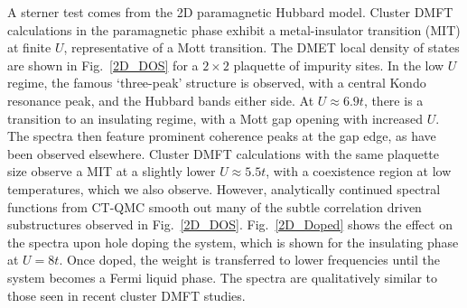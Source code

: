 \documentclass[aps,twocolumn,nobibnotes]{revtex4}
\begin{document}
A sterner test comes from the 2D paramagnetic Hubbard model. Cluster DMFT calculations in the paramagnetic phase exhibit a metal-insulator transition (MIT)
at finite $U$, representative of a Mott transition\cite{Georges1996,Senechal2000,Kotliar2008,Millis2012,Millis2013,Zgid2012}.
The DMET local density of
states are shown in Fig.~\ref{2D_DOS} for a $2 \times 2$ plaquette of impurity sites. In the low $U$ regime, the famous `three-peak' structure 
is observed, with a central Kondo resonance peak, and the Hubbard bands either side. At $U \approx 6.9t$, there is a transition to an insulating 
regime, with a Mott gap opening with increased $U$. The spectra then feature prominent coherence peaks at the gap edge, as have been observed 
elsewhere\cite{Kotliar2008}. Cluster DMFT calculations with the same plaquette size observe a MIT at a slightly lower $U\approx5.5t$, 
with a coexistence region at low temperatures, which we also observe. However, analytically continued
spectral functions from CT-QMC smooth out many of the subtle correlation driven substructures observed in Fig.~\ref{2D_DOS}. 
Fig.~\ref{2D_Doped} shows the effect on the 
spectra upon hole doping the system, which is shown for the insulating phase at $U=8t$. Once doped, the weight is transferred to lower frequencies
until the system becomes a Fermi liquid phase. The spectra are qualitatively similar to those seen in recent cluster DMFT studies\cite{Masatoshi2009}.
\end{document}
